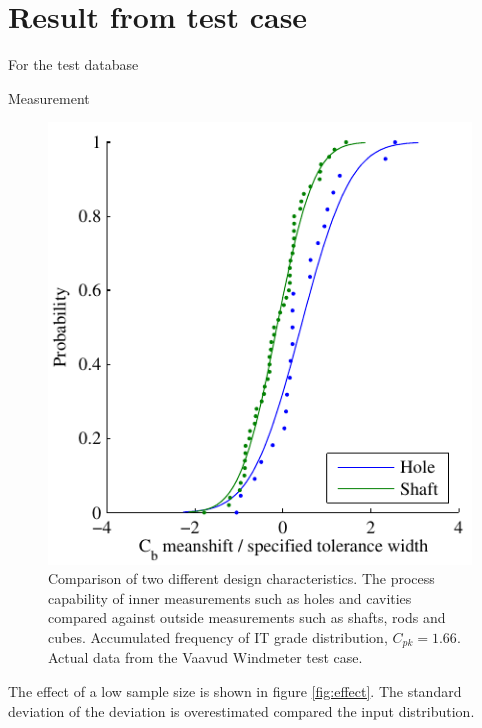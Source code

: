 \documentclass[aip,amsmath, reprint, author-year]{revtex4-1}
\begin{document}
\section{Result from test case}
\label{sec:result}

For the test database 

Measurement 


\begin{figure}
\includegraphics{Cb_holeshaft.pdf}
\caption{\label{fig:acumfreqF3} Comparison of two different design characteristics. 
The process capability of inner measurements such as holes and cavities compared against outside measurements such as shafts, rods and cubes. 
Accumulated frequency of IT grade distribution, $C_{pk} =1.66$. 
Actual data from the Vaavud Windmeter test case. }
\end{figure}


The effect of a low sample size is shown in figure \ref{fig:effect}. 
The standard deviation of the deviation is overestimated compared the input distribution.
\end{document}

